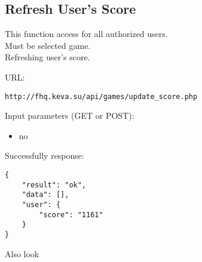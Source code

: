 \subsection{Refresh User's Score}
\par

This function access for all authorized users. \\
Must be selected game. \\
Refreshing user's score.

URL:
\begin{Verbatim}[frame=single]
http://fhq.keva.su/api/games/update_score.php
\end{Verbatim}

Input parameters (GET or POST):
\begin{itemize}
  \item no
\end{itemize}

Successfully response:  \\
\begin{Verbatim}[frame=single]
{
    "result": "ok",
    "data": [],
    "user": {
        "score": "1161"
    }
}
\end{Verbatim}



Also look ~

